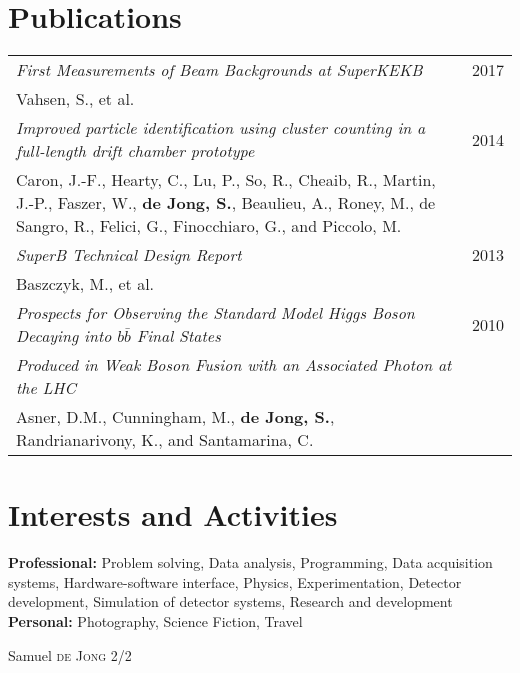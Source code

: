 \documentclass{article}
\begin{document}
\section{Publications}
\begin{tabular}{p{14cm}l}
  \textit{First Measurements of Beam Backgrounds at SuperKEKB} & 2017\\
	 Vahsen, S., et al. &\smallskip\\



 \textit{Improved particle identification using cluster counting in a full-length drift chamber prototype} & 2014\\
Caron, J.-F., Hearty, C., Lu, P., So, R., Cheaib, R., Martin, J.-P., Faszer, W., \textbf{de Jong, S.}, Beaulieu, A., Roney, M., de Sangro, R., Felici, G.,  Finocchiaro, G., and Piccolo, M. &\smallskip\\


 \textit{SuperB Technical Design Report} & 2013\\
	{Baszczyk, M., et al.} &\smallskip\\

\textit{Prospects for Observing the Standard Model Higgs Boson Decaying into $b\bar{b}$ Final States} & 2010 \\ \textit{Produced in Weak Boson Fusion with an Associated Photon at the LHC} &\\
 {Asner, D.M., Cunningham, M., \textbf{de Jong, S.}, Randrianarivony, K., and Santamarina, C. }&\\


\end{tabular}



\section{Interests and Activities}
\textbf{Professional:}
Problem solving, Data analysis, Programming, Data acquisition systems, Hardware-software interface, Physics, Experimentation, Detector development, Simulation of detector systems, Research and development\\
\textbf{Personal:}
Photography, Science Fiction, Travel

\vspace{\fill}
\centering Samuel \textsc{de Jong} 2/2
\end{document}
